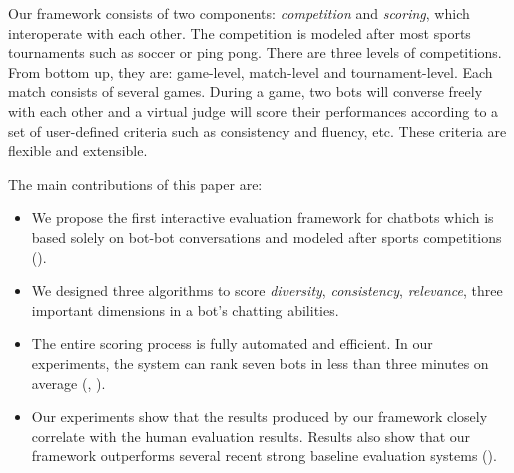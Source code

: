 Our framework consists of two components: \textit{competition} and 
\textit{scoring}, which interoperate with each other. 
The competition is modeled
after most sports tournaments such as soccer or ping pong. 
There are three levels of competitions. From bottom up, they are:
game-level, match-level and tournament-level. 
Each match consists of several games. During a game, two bots will converse 
freely with each other and a virtual judge will score their performances 
according to a set of user-defined criteria such as consistency and fluency, 
etc.  These criteria are flexible and extensible.


The main contributions of this paper are:
\begin{itemize}
\item We propose the first interactive evaluation framework for chatbots which
is based solely on bot-bot conversations and modeled after sports competitions ().
\item We designed three algorithms to score \textit{diversity}, \textit{consistency}, \textit{relevance}, three important dimensions in a bot's chatting 
abilities.
\item  The entire scoring process is fully automated and efficient. 
In our experiments, the system can rank seven bots in less than 
three minutes on average (, ).
\item  Our experiments show that the results produced by our framework
closely correlate with the human evaluation results. 
Results also show that our framework outperforms 
several recent strong baseline evaluation systems ().
\end{itemize}
